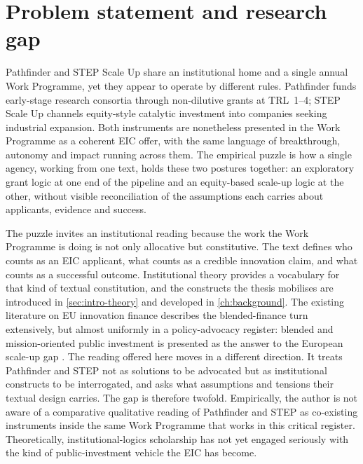 \section{Problem statement and research gap}
\label{sec:intro-problem}
Pathfinder and STEP Scale Up share an institutional home and a single
annual Work Programme, yet they appear to operate by different rules.
Pathfinder funds early-stage research consortia through non-dilutive
grants at TRL~1--4; STEP Scale Up channels equity-style catalytic
investment into companies seeking industrial expansion. Both
instruments are nonetheless presented in the Work Programme as a
coherent EIC offer, with the same language of breakthrough, autonomy
and impact running across them. The empirical puzzle is how a single
agency, working from one text, holds these two postures together: an
exploratory grant logic at one end of the pipeline and an equity-based
scale-up logic at the other, without visible reconciliation of the
assumptions each carries about applicants, evidence and success.

The puzzle invites an institutional reading because the work the Work
Programme is doing is not only allocative but constitutive. The text
defines who counts as an EIC applicant, what counts as a credible
innovation claim, and what counts as a successful outcome. Institutional
theory provides a vocabulary for that kind of textual constitution, and
the constructs the thesis mobilises are introduced in
\cref{sec:intro-theory} and developed in \cref{ch:background}. The
existing literature on EU innovation finance describes the
blended-finance turn extensively, but almost uniformly in a
policy-advocacy register: blended and mission-oriented public
investment is presented as the answer to the European scale-up gap
\parencite{mazzucato2013entrepreneurial}. The reading offered here moves in a
different direction. It treats Pathfinder and STEP not as solutions to
be advocated but as institutional constructs to be interrogated, and
asks what assumptions and tensions their textual design carries. The
gap is therefore twofold. Empirically, the author is not aware of a
comparative qualitative reading of Pathfinder and STEP as co-existing
instruments inside the same Work Programme that works in this critical
register. Theoretically, institutional-logics scholarship has not yet
engaged seriously with the kind of public-investment vehicle the EIC
has become.

